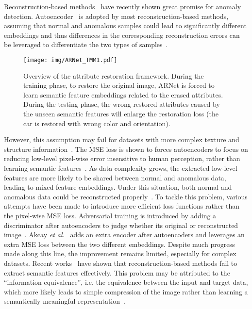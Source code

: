 \documentclass[journal]{IEEEtran}
\begin{document}
Reconstruction-based methods~\cite{schlegl2017unsupervised, Akcay2018,Sabokrou2018Adversarially} have recently shown great promise for anomaly detection. 
Autoencoder~\cite{masci2011stacked} is adopted by most reconstruction-based methods, assuming that normal and anomalous samples could lead to significantly different embeddings and thus differences in the corresponding reconstruction errors can be leveraged to differentiate the two types of samples~\cite{Sakurada2014Anomaly}. 
\begin{figure*}[t]
\centering
\texttt{[image: img/ARNet\_TMM1.pdf]}
\caption{Overview of the attribute restoration framework. During the training phase, to restore the original image, ARNet is forced to learn semantic feature embeddings related to the erased attributes. During the testing phase, the wrong restored attributes caused by the unseen semantic features will enlarge the restoration loss (the car is restored with wrong color and orientation).}
\label{fig:arnet}
\end{figure*}
However, this assumption may fail for datasets with more complex texture and structure information~\cite{russakovsky2015imagenet}. The MSE loss is shown to forces autoencoders to focus on reducing low-level pixel-wise error insensitive to human perception, rather than learning semantic features~\cite{SimilarityMetricAutoencoding,dosovitskiy2016generating}. As data complexity grows, the extracted low-level features are more likely to be shared between normal and anomalous data, leading to mixed feature embeddings. Under this situation, both normal and anomalous data could be reconstructed properly~\cite{gong2019memorizing,zong2018deep}.
To tackle this problem, various attempts have been made to introduce more efficient loss functions rather than the pixel-wise MSE loss. Adversarial training is introduced by adding a discriminator after autoencoders to judge whether its original or reconstructed image~\cite{Sabokrou2018Adversarially,deecke2018image}. Akcay \emph{et al.}~\cite{Akcay2018} adds an extra encoder after autoencoders and leverages an extra MSE loss between the two different embeddings. Despite much progress made along this line, the improvement remains limited, especially for complex datasets. Recent works~\cite{wang2019effective,bergmann2020uninformed} have shown that reconstruction-based methods fail to extract semantic features effectively. This problem may be attributed to the ``information equivalence'', i.e. the equivalence between the input and target data, which more likely leads to simple compression of the image rather than learning a semantically meaningful representation~\cite{pathak2016context}.
\end{document}
